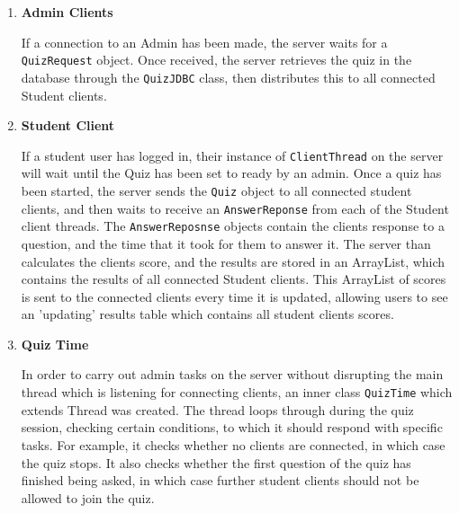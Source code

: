 \begin{enumerate}
	\item \textbf{Admin Clients}

	If a connection to an Admin has been made, the server waits for a
	\texttt{QuizRequest} object. Once received, the server retrieves the quiz
        in the database through the \texttt{QuizJDBC} class, then distributes this 
        to all connected Student clients.

	\item \textbf{Student Client}

	If a student user has logged in, their instance of \texttt{ClientThread} 
        on the server will wait until the Quiz has been set to ready by an admin. 
        Once a quiz has been started, the server sends the \texttt{Quiz} object to
	all connected student clients, and then waits to receive an \texttt{AnswerReponse}
	from each of the Student client threads. The \texttt{AnswerReposnse} objects 
        contain the clients response to a question, and the time that it took for 
        them to answer it.  The server than calculates the clients score,
	and the results are stored in an ArrayList, which contains the results of
	all connected Student clients.  This ArrayList of scores is sent to
	the connected clients every time it is updated, allowing users to see an
        'updating' results table which contains all student clients scores.

        \item \textbf{Quiz Time}
         
        In order to carry out admin tasks on the server without disrupting the
        main thread which is listening for connecting clients, an inner class
        \texttt{QuizTime} which extends Thread was created. The thread loops through 
        during the quiz session, checking certain conditions, to which it 
        should respond with specific tasks. For example, it checks whether no 
        clients are connected, in which case the quiz stops. It also checks 
        whether the first question of the quiz has finished being asked, in 
        which case further student clients should not be allowed to join the
        quiz.
        
    
        

\end{enumerate}
